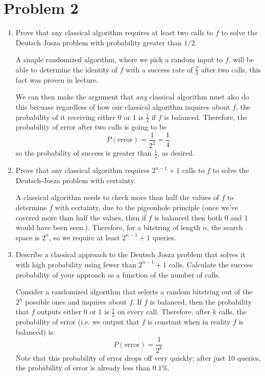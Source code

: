 \documentclass[10pt]{article}
\begin{document}
	\section*{Problem 2}
	\begin{enumerate}[label=\alph*)]
		\item Prove that any classical algorithm requires at least two calls to \( f \) to solve the Deutsch 
			Josza problem with probability greater than \( 1 / 2 \). 

			\begin{solution}
				A simple randomized algorithm, where we pick a random input to \( f \), will be able to 
				determine the identity of \( f \) with a success rate of \( \frac{2}{3} \) after two calls, this 
				fact was proven in lecture. 

				We can then make the argument that \textit{any} classical algorithm must also do this becuase 
				regardless of how our classical algorithm inquires about \( f \), the probability of it receiving 
				either 0 or 1 is \( \frac{1}{2} \) if \( f \) is balanced. Therefore, the probability of error 
				after two calls
				is going to be 
				\[
				P(\text{error}) = \frac{1}{2^2} = \frac{1}{4}
				\] 
				so the probability of success is greater than \( \frac{1}{2} \), as desired.
			\end{solution}
		\item Prove that any classical algorithm requires \( 2^{n - 1} + 1 \) calls to \( f \) to 
			solve the Deutsch-Josza problem with certainty.

			\begin{solution}
				A classical algorithm needs to check more than half the 
				values of \( f \) to determine \( f \) with certainty, due to the pigeonhole principle (once 
				we've covered more than half the values, then if \( f \) is balanced then both 0 and 1 would have 
				been seen.). Therefore, for a bitstring of length \( n \), the search space is \( 2^{n} \), so 
				we require at least \( 2^{n - 1}  + 1 \) queries. 
			\end{solution}
		\item Describe a classical approach to the Deutsch Josza problem that solves it with 
			high probability using fewer than \( 2^{n - 1} + 1 \) calls. Calculate the success probability of 
			your approach as a function of the number of calls.

			\begin{solution}
				Consider a randomized algorithm	that selects a random bitstring out of the \( 2^{n} \) possible 
				ones and inquires about \( f \). If \( f \) is balanced, then the probability that \( f \) outputs 
				either 0 or 1 is \( \frac{1}{2} \) on every call. Therefore, after \( k \) calls, the probability 
				of error (i.e. we output that \( f \) is constant when in reality \( f \) is balanced) is: 
				\[
				P(\text{error}) = \frac{1}{2^{k}}
				\] 
				Note that this probability of error drops off very quickly; after just 10 queries, the probability
				of error is already less than 0.1\%. 
			\end{solution}
	\end{enumerate}
	\pagebreak
\end{document}
